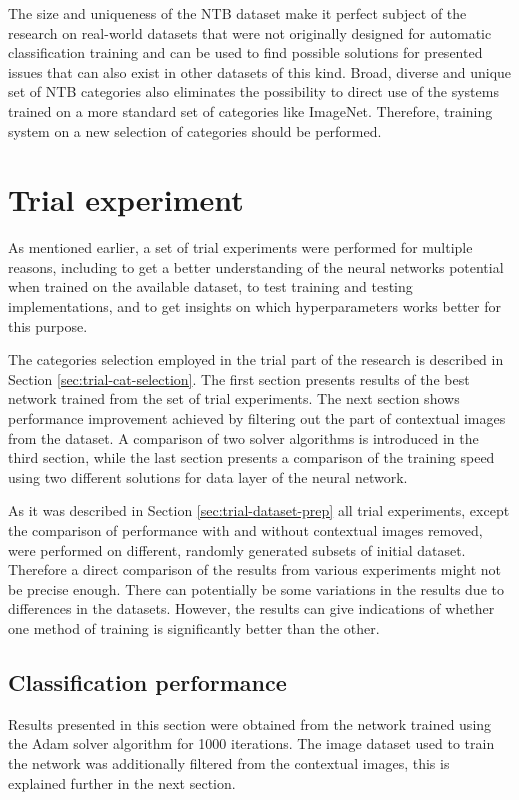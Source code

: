 The size and uniqueness of the NTB dataset make it perfect subject of the research on real-world datasets that were not originally designed for automatic classification training and can be used to find possible solutions for presented issues that can also exist in other datasets of this kind. Broad, diverse and unique set of NTB categories also eliminates the possibility to direct use of the systems trained on a more standard set of categories like ImageNet. Therefore, training system on a new selection of categories should be performed.


\section{Trial experiment}
As mentioned earlier, a set of trial experiments were performed for multiple reasons, including to get a better understanding of the neural networks potential when trained on the available dataset, to test training and testing implementations, and to get insights on which hyperparameters works better for this purpose.

The categories selection employed in the trial part of the research is described in Section \ref{sec:trial-cat-selection}. The first section presents results of the best network trained from the set of trial experiments. The next section shows performance improvement achieved by filtering out the part of contextual images from the dataset. A comparison of two solver algorithms is introduced in the third section, while the last section presents a comparison of the training speed using two different solutions for data layer of the neural network.

As it was described in Section \ref{sec:trial-dataset-prep} all trial experiments, except the comparison of performance with and without contextual images removed, were performed on different, randomly generated subsets of initial dataset. Therefore a direct comparison of the results from various experiments might not be precise enough. There can potentially be some variations in the results due to differences in the datasets. However, the results can give indications of whether one method of training is significantly better than the other.

\subsection{Classification performance}
    Results presented in this section were obtained from the network trained using the Adam solver algorithm for 1000 iterations. The image dataset used to train the network was additionally filtered from the contextual images, this is explained further in the next section.
    

